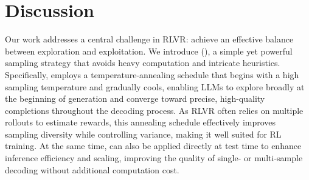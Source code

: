 \section{Discussion}
Our work addresses a central challenge in RLVR: achieve an effective balance between exploration and exploitation.
%
We introduce \algname (\alg), a simple yet powerful sampling strategy that avoids heavy computation and intricate heuristics.
%
Specifically, \alg employs a temperature-annealing schedule that begins with a high sampling temperature and gradually cools, enabling LLMs to explore broadly at the beginning of generation and converge toward precise, high-quality completions throughout the decoding process.
%
As RLVR often relies on multiple rollouts to estimate rewards, this annealing schedule effectively improves sampling diversity while controlling variance, making it well suited for RL training.
%
At the same time, \alg can also be applied directly at test time to enhance inference efficiency and scaling, improving the quality of single- or multi-sample decoding without additional computation cost.
%
%


